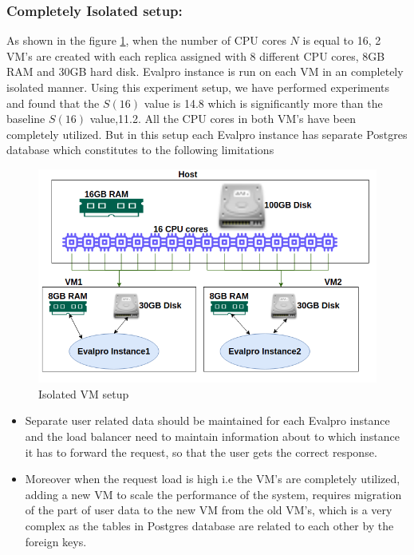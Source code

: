 \documentclass[sigconf]{acmart}
\begin{document}
\subsubsection{Completely Isolated setup:}
As shown in the figure \ref{isolated_vm}, when the number of CPU cores $N$ is equal to 16, 2 VM's are created with each replica assigned with 8  different CPU cores, 8GB RAM and 30GB hard disk. Evalpro instance is run on each VM in an completely isolated manner. Using this experiment setup, we have performed experiments and found that the $S(16)$ value is 14.8 which is significantly more than the baseline $S(16)$ value,11.2. All the CPU cores in both VM's have been completely utilized. But in this setup each Evalpro instance has separate  Postgres database which constitutes to the following limitations
\begin{figure}[!htb]
  \centering
  \includegraphics[width=\linewidth]{Pictures/isolated_vm.png}
  \caption{Isolated VM setup}
  \label{isolated_vm}
\end{figure}
\begin{itemize}
    \item 
    Separate user related data should be maintained for each Evalpro instance
    and the load balancer need to maintain information about to which instance it has to forward the request, so that the user gets the correct response.
    \item
    Moreover when the request load is high i.e the VM's are completely utilized, adding a new VM to scale the performance of the system, requires migration of the part of user data to the new VM from the old VM's, which is a very complex as the tables in Postgres database are related to each other by the foreign keys.
\end{itemize}
\end{document}
